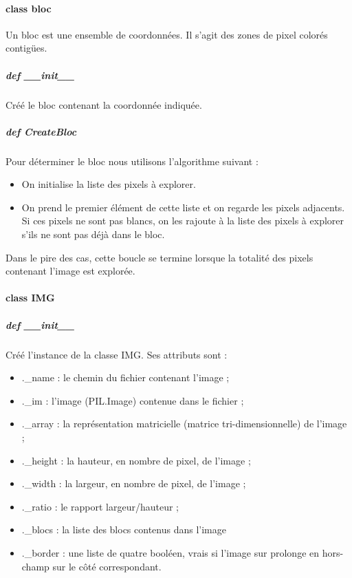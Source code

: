 \documentclass[a4paper,12pt]{article}
\begin{document}
\paragraph{class bloc}
Un bloc est une ensemble de coordonnées. Il s'agit des zones de pixel colorés contigües.
\subparagraph{def \_\_init\_\_}
Créé le bloc contenant la coordonnée indiquée.
\subparagraph{def CreateBloc}
Pour déterminer le bloc nous utilisons l'algorithme suivant :
\begin{itemize}
\item On initialise la liste des pixels à explorer.
\item On prend le premier élément de cette liste et on regarde les pixels adjacents. Si ces pixels ne sont pas blancs, on les rajoute à la liste des pixels à explorer s'ils ne sont pas déjà dans le bloc. 
\end{itemize}

Dans le pire des cas, cette boucle se termine lorsque la totalité des pixels contenant l'image est explorée.
\paragraph{class IMG}
\subparagraph{def \_\_init\_\_}
Créé l'instance de la classe IMG. Ses attributs sont :
\begin{itemize}
\item .\_name : le chemin du fichier contenant l'image ;
\item .\_im : l'image (PIL.Image) contenue dans le fichier ;
\item .\_array : la représentation matricielle (matrice tri-dimensionnelle) de l'image ; 
\item .\_height : la hauteur, en nombre de pixel, de l'image ; 
\item .\_width : la largeur, en nombre de pixel, de l'image ;
\item .\_ratio : le rapport largeur/hauteur ;
\item .\_blocs : la liste des blocs contenus dans l'image
\item .\_border : une liste de quatre booléen, vrais si l'image sur prolonge en hors-champ sur le côté correspondant.
\end{itemize}
\end{document}
